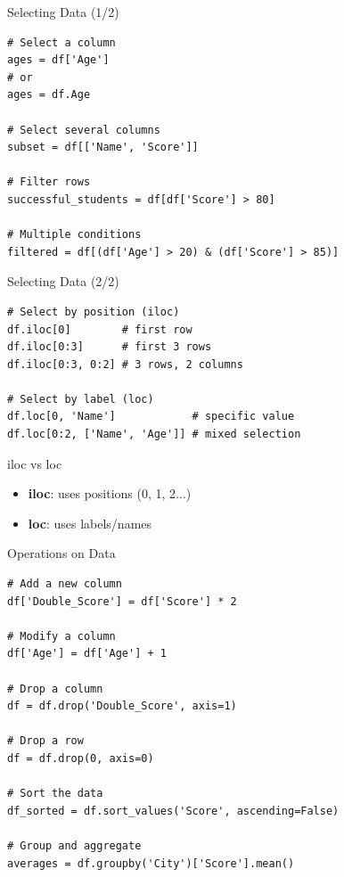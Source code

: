 \documentclass[aspectratio=169]{beamer}
\begin{document}
\begin{frame}[fragile]{Selecting Data (1/2)}
\begin{lstlisting}
# Select a column
ages = df['Age']
# or
ages = df.Age

# Select several columns
subset = df[['Name', 'Score']]

# Filter rows
successful_students = df[df['Score'] > 80]

# Multiple conditions
filtered = df[(df['Age'] > 20) & (df['Score'] > 85)]
\end{lstlisting}
\end{frame}

\begin{frame}[fragile]{Selecting Data (2/2)}
\begin{lstlisting}
# Select by position (iloc)
df.iloc[0]        # first row
df.iloc[0:3]      # first 3 rows
df.iloc[0:3, 0:2] # 3 rows, 2 columns

# Select by label (loc)
df.loc[0, 'Name']            # specific value
df.loc[0:2, ['Name', 'Age']] # mixed selection
\end{lstlisting}

\vspace{0.3cm}
\begin{block}{iloc vs loc}
\begin{itemize}
    \item \textbf{iloc}: uses positions (0, 1, 2...)
    \item \textbf{loc}: uses labels/names
\end{itemize}
\end{block}
\end{frame}

\begin{frame}[fragile]{Operations on Data}
\begin{lstlisting}
# Add a new column
df['Double_Score'] = df['Score'] * 2

# Modify a column
df['Age'] = df['Age'] + 1

# Drop a column
df = df.drop('Double_Score', axis=1)

# Drop a row
df = df.drop(0, axis=0)

# Sort the data
df_sorted = df.sort_values('Score', ascending=False)

# Group and aggregate
averages = df.groupby('City')['Score'].mean()
\end{lstlisting}
\end{frame}
\end{document}
